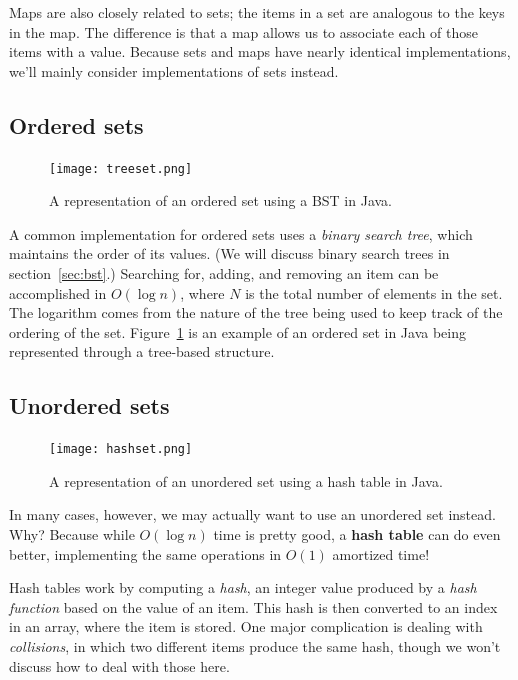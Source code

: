 Maps are also closely related to sets; the items in a set are analogous to the keys in the map. The difference is that a map allows us to associate each of those items with a value. Because sets and maps have nearly identical implementations, we'll mainly consider implementations of sets instead.


\subsection{Ordered sets}

\begin{figure}[h]
\centering
\texttt{[image: treeset.png]}
\caption{A representation of an ordered set using a BST in Java.}
\label{fig:ordered-set}
\end{figure}

A common implementation for ordered sets uses a \textit{binary search tree}, which maintains the order of its values. (We will discuss binary search trees in section~\ref{sec:bst}.) Searching for, adding, and removing an item can be accomplished in $O(\log n)$, where $N$ is the total number of elements in the set. The logarithm comes from the nature of the tree being used to keep track of the ordering of the set. Figure~\ref{fig:ordered-set} is an example of an ordered set in Java being represented through a tree-based structure.


\subsection{Unordered sets}

\begin{figure}[h]
\centering
\texttt{[image: hashset.png]} 
\caption{A representation of an unordered set using a hash table in Java.}
\label{fig:unordered-set}
\end{figure}

In many cases, however, we may actually want to use an unordered set instead. Why? Because while $O(\log n)$ time is pretty good, a \textbf{hash table} can do even better, implementing the same operations in $O(1)$ amortized time!

Hash tables work by computing a \textit{hash}, an integer value produced by a \textit{hash function} based on the value of an item. This hash is then converted to an index in an array, where the item is stored. One major complication is dealing with \textit{collisions}, in which two different items produce the same hash, though we won't discuss how to deal with those here.

